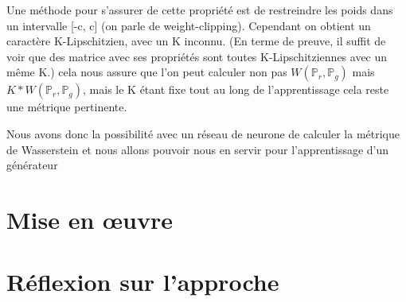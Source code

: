 Une méthode pour s'assurer de cette propriété est de restreindre les poids dans un intervalle [-c, c] (on parle de weight-clipping). Cependant on obtient un caractère K-Lipschitzien, avec un K inconnu. (En terme de preuve, il suffit de voir que des matrice avec ses propriétés sont toutes K-Lipschitziennes avec un même K.) cela nous assure que l'on peut calculer non pas $W(\mathbb{P}_r, \mathbb{P}_g)$ mais $K*W(\mathbb{P}_r, \mathbb{P}_g)$, mais le K étant fixe tout au long de l'apprentissage cela reste une métrique pertinente.

Nous avons donc la possibilité avec un réseau de neurone de calculer la métrique de Wasserstein et nous allons pouvoir nous en servir pour l'apprentissage d'un générateur

\section{Mise en œuvre}

\section{Réflexion sur l'approche}